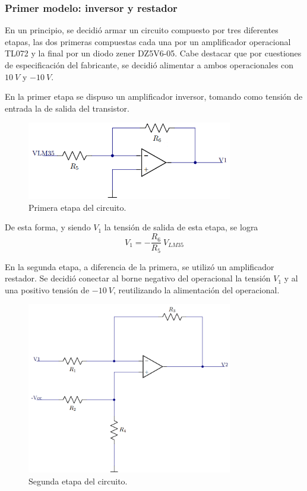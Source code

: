 \documentclass[a4paper]{article}
\begin{document}
\subsubsection{Primer modelo: inversor y restador}

En un principio, se decidió armar un circuito compuesto por tres diferentes etapas, las dos primeras compuestas cada una por un amplificador operacional TL072 y la final por un diodo zener DZ5V6-05. Cabe destacar que por cuestiones de especificación del fabricante, se decidió alimentar a ambos operacionales con $10 \ V$ y $-10 \ V$.

En la primer etapa se dispuso un amplificador inversor, tomando como tensión de entrada la de salida del transistor.

\begin{figure}[H]
	\centering
	\includegraphics[width=0.8\textwidth]{Ejercicio6/Imagenes/CircuitoEtapa1-M1.png}
\caption{Primera etapa del circuito.}
	\label{fig:cir1-M1}
\end{figure}

De esta forma, y siendo $V_1$ la tensión de salida de esta etapa, se logra
\[
	V_1 = -\frac{R_6}{R_5} \ V_{LM35}
	\label{equ:m1p1}
\]

En la segunda etapa, a diferencia de la primera, se utilizó un amplificador restador. Se decidió conectar al borne negativo del operacional la tensión $V_1$ y al  una positivo tensión de $- 10 \ V$, reutilizando la alimentación del operacional.

\begin{figure}[H]
	\centering
	\includegraphics[width=0.8\textwidth]{Ejercicio6/Imagenes/CircuitoEtapa2-M1.png}
	\caption{Segunda etapa del circuito.}
	\label{fig:cir2-M1}
\end{figure}
\end{document}
